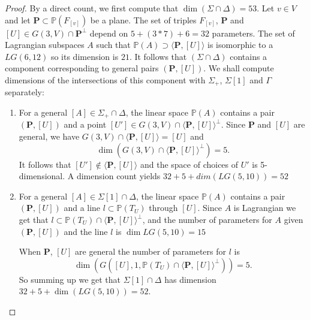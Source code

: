 \documentclass[a4paper,11pt]{amsart}
\theoremstyle{definition}
\numberwithin{equation}{section}
\numberwithin{equation}{section} \theoremstyle{definition}
\begin{document}
 \begin{proof} By a direct count, we first compute that $\dim (\Sigma\cap \Delta) = 53$. Let $v\in V$ and let $\mathbf{P}\subset {{\mathbb{P}}}(F_{[v]})$ be a plane.  The set of triples $F_{[v]}$,  $\mathbf{P}$ and $[U]\in G(3,V)\cap \mathbf{P}^{\perp}$ 
 depend on $5 +(3*7)+6=32$ parameters. The set of Lagrangian subspaces $A$ such that ${{\mathbb{P}}}(A)\supset\langle\mathbf{P},[U]\rangle $ is isomorphic to a $LG(6,12)$ so its dimension is $21$. It follows that $(\Sigma\cap \Delta)$ contains a component  corresponding to general pairs $(\mathbf{P},[U])$.
 We shall compute dimensions of the intersections of this component with $\Sigma_+$, $\Sigma[1]$ and $\Gamma$ separately: 
 \begin{enumerate}
 \item For a general $[A]\in\Sigma_+\cap\Delta$, the linear space ${{\mathbb{P}}}(A)$ contains a pair $(\mathbf{P},[U])$ and a point $[U']\in G(3,V)\cap \langle\mathbf{P},[U]\rangle^{\perp}$. Since $\mathbf{P}$ and $[U]$ are general, we have  $G(3,V)\cap\langle\mathbf{P},[U]\rangle= [U]$ and 
 \[
 \dim(G(3,V)\cap \langle\mathbf{P},[U]\rangle^{\perp})=5.
 \]
  It follows that $[U']\notin \langle\mathbf{P},[U]\rangle$ and the space of choices of $U'$ is 5-dimensional. A dimension count yields $32+5+dim(LG(5,10))=52$
  \item For a general $[A]\in\Sigma[1]\cap\Delta$, the linear space ${{\mathbb{P}}}(A)$ contains a pair $(\mathbf{P},[U])$ and a line $l\subset {{\mathbb{P}}}(T_{U})$ through $[U]$.   Since $A$ is Lagrangian we get that $l\subset {{\mathbb{P}}}(T_{U})\cap \langle\mathbf{P},[U]\rangle^{\perp}$, and the number of parameters for $A$ given 
  $(\mathbf{P},[U])$ and the line $l$ is $\dim LG(5,10) =15$

  
  When $\mathbf{P}$, $[U]$ are general the number of parameters for $l$ is
  \[
  \dim (G([U],1,{{\mathbb{P}}}(T_{U})\cap \langle\mathbf{P},[U]\rangle^{\perp}))=5.
  \]
 So summing up we get that  $\Sigma[1]\cap\Delta$ has dimension $32+5+\dim(LG(5,10))=52$.


\end{enumerate}
\end{proof}
\end{document}
